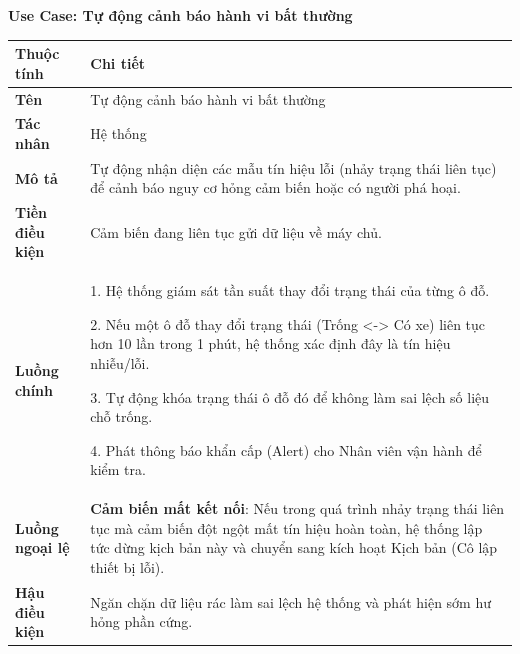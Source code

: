 \noindent \textbf{Use Case: Tự động cảnh báo hành vi bất thường} \\
\renewcommand{\arraystretch}{1.6}
\begin{xltabular}{\textwidth}{|l|X|}
\hline
\textbf{Thuộc tính} & \textbf{Chi tiết} \\
\hline
\textbf{Tên} & Tự động cảnh báo hành vi bất thường \\
\hline
\textbf{Tác nhân} & Hệ thống \\
\hline
\textbf{Mô tả} & Tự động nhận diện các mẫu tín hiệu lỗi (nhảy trạng thái liên tục) để cảnh báo nguy cơ hỏng cảm biến hoặc có người phá hoại. \\
\hline
\textbf{Tiền điều kiện} & Cảm biến đang liên tục gửi dữ liệu về máy chủ. \\
\hline
\textbf{Luồng chính} & 
1. Hệ thống giám sát tần suất thay đổi trạng thái của từng ô đỗ.

2. Nếu một ô đỗ thay đổi trạng thái (Trống <-> Có xe) liên tục hơn 10 lần trong 1 phút, hệ thống xác định đây là tín hiệu nhiễu/lỗi.

3. Tự động khóa trạng thái ô đỗ đó để không làm sai lệch số liệu chỗ trống.

4. Phát thông báo khẩn cấp (Alert) cho Nhân viên vận hành để kiểm tra.
\\
\hline

\textbf{Luồng ngoại lệ} & 
\textbf{Cảm biến mất kết nối}: Nếu trong quá trình nhảy trạng thái liên tục mà cảm biến đột ngột mất tín hiệu hoàn toàn, hệ thống lập tức dừng kịch bản này và chuyển sang kích hoạt Kịch bản (Cô lập thiết bị lỗi).
\\
\hline

\textbf{Hậu điều kiện} & Ngăn chặn dữ liệu rác làm sai lệch hệ thống và phát hiện sớm hư hỏng phần cứng.\\
\hline
\end{xltabular}

